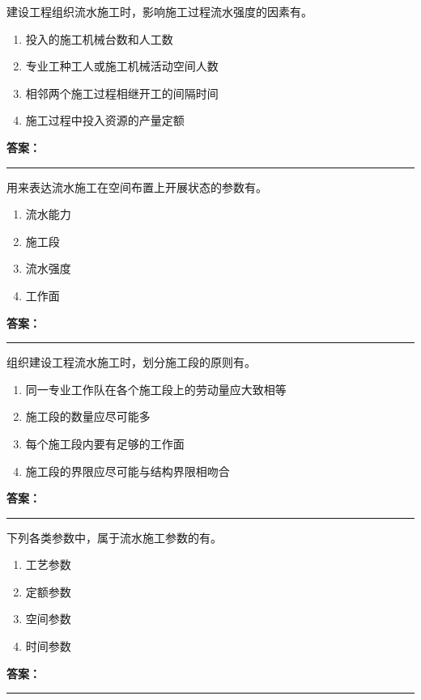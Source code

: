 \documentclass[UTF8,fontset=fandol,11pt]{ctexart}
\newcommand{\answerline}{\textcolor{answerred}{\rule{2.4cm}{0.7pt}}}
\begin{document}
\begin{quizbox}[title={第 19 题}]
建设工程组织流水施工时，影响施工过程流水强度的因素有。\\
\begin{enumerate}[label=\Alph*.]
\item 投入的施工机械台数和人工数
\item 专业工种工人或施工机械活动空间人数
\item 相邻两个施工过程相继开工的间隔时间
\item 施工过程中投入资源的产量定额
\end{enumerate}
\textbf{\textcolor{answerred}{答案：}} \answerline
\end{quizbox}

\begin{quizbox}[title={第 20 题}]
用来表达流水施工在空间布置上开展状态的参数有。\\
\begin{enumerate}[label=\Alph*.]
\item 流水能力
\item 施工段
\item 流水强度
\item 工作面
\end{enumerate}
\textbf{\textcolor{answerred}{答案：}} \answerline
\end{quizbox}

\begin{quizbox}[title={第 21 题}]
组织建设工程流水施工时，划分施工段的原则有。\\
\begin{enumerate}[label=\Alph*.]
\item 同一专业工作队在各个施工段上的劳动量应大致相等
\item 施工段的数量应尽可能多
\item 每个施工段内要有足够的工作面
\item 施工段的界限应尽可能与结构界限相吻合
\end{enumerate}
\textbf{\textcolor{answerred}{答案：}} \answerline
\end{quizbox}

\begin{quizbox}[title={第 22 题}]
下列各类参数中，属于流水施工参数的有。\\
\begin{enumerate}[label=\Alph*.]
\item 工艺参数
\item 定额参数
\item 空间参数
\item 时间参数
\end{enumerate}
\textbf{\textcolor{answerred}{答案：}} \answerline
\end{quizbox}
\end{document}
